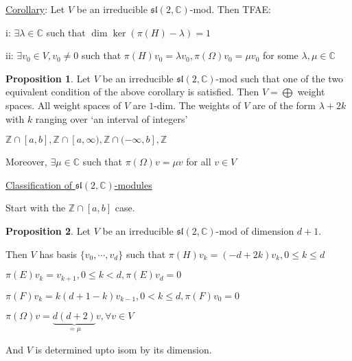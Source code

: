 \documentclass{article}
\theoremstyle{definition}
\newtheorem{proposition}{Proposition}
\begin{document}
\underline{Corollary}: Let \(V\) be an irreducible \(\mathfrak{sl}(2,\mathbb{C})\)-mod. Then TFAE:

i: \(\exists \lambda \in \mathbb{C}\) such that \(\dim \ker (\pi(H)-\lambda)=1\)

ii: \(\exists v_0\in V, v_0\neq 0\) such that \(\pi(H)v_0 = \lambda v_0, \pi(\Omega)v_0 = \mu v_0\) for some \(\lambda , \mu \in \mathbb{C}\)

\begin{proposition}
    Let \(V\) be an irreducible \(\mathfrak{sl}(2,\mathbb{C})\)-mod such that one of the two equivalent condition of the above corollary is satisfied. Then \(V = \bigoplus\) weight spaces. All weight spaces of \(V\) are \(1\)-dim. The weights of \(V\) are of the form \(\lambda + 2k\) with \(k\) ranging over `an interval of integers'
    
    \(\mathbb{Z} \cap [a,b], \mathbb{Z}\cap [a,\infty), \mathbb{Z} \cap (-\infty, b], \mathbb{Z}\)
    
    Moreover, \(\exists \mu \in \mathbb{C}\) such that \(\pi(\Omega)v = \mu v\) for all \(v\in V\)   
\end{proposition}

\underline{Classification of \(\mathfrak{sl}(2,\mathbb{C})\)-modules}

Start with the \(\mathbb{Z} \cap [a,b]\) case.

\begin{proposition}
    Let \(V\) be an irreducible \(\mathfrak{sl}(2,\mathbb{C})\)-mod of dimension \(d+1\).

    Then \(V\) has basis \(\{ v_0, \cdots, v_d \} \) such that \(\pi(H)v_k = (-d + 2k)v_k, 0 \leq k \leq d\)
    
    \(\pi (E)v_k = v_{k+1}, 0 \leq k < d, \pi (E)v_d = 0\)
    
    \(\pi(F)v_k = k(d+1-k)v_{k-1}, 0 < k \leq d, \pi(F)v_0 = 0\)
    
    \(\pi(\Omega)v = \underbrace{d(d+2)}_{=\mu}v, \forall v\in V\)
    
    And \(V\) is determined upto isom by its dimension.

\end{proposition}
\end{document}
